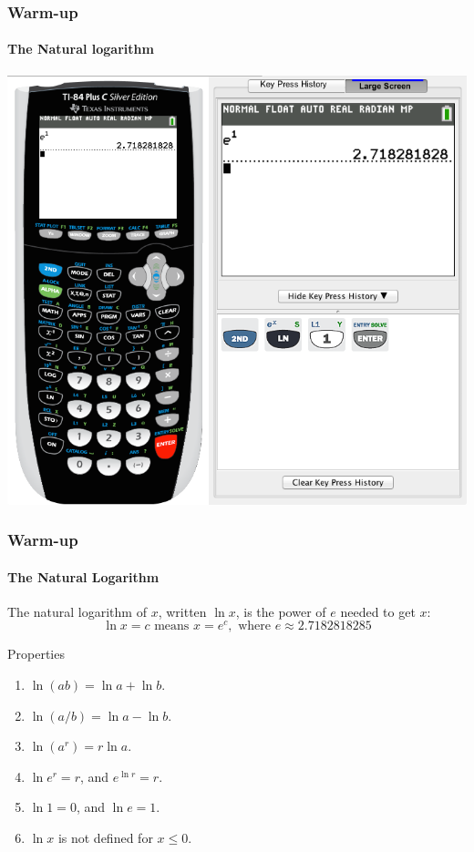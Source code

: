\documentclass[9pt,xcolor=x11names,compress]{beamer}
\begin{document}
\begin{frame}[c]\frametitle{Warm-up}
    
\framesubtitle{The Natural logarithm}

\begin{center}
\includegraphics[height=0.8\textheight]{ti84e.png}
\end{center}
\end{frame}

\begin{frame}[t]\frametitle{Warm-up}
\framesubtitle{The Natural Logarithm}
	\begin{definition}
	   The \alert{natural logarithm} of $x$, written $\ln x$, is the power of $e$ needed to get $x$:
	   \begin{equation*}
	   	\ln x = c \text{ means } x=e^c, \text{ where } e\approx 2.7182818285
	   \end{equation*}
	\end{definition}	
	\begin{block}{Properties}
	\begin{enumerate}[<+-|alert@+>]
		\item $\ln (ab) = \ln a + \ln b$.
		\item $\ln (a/b) = \ln a - \ln b$.
		\item $\ln (a^r) = r \ln a$.
		\item $\ln e^r = r$, and $e^{\ln r} = r$.
		\item $\ln 1 = 0$, and $\ln e = 1$.
		\item $\ln x$ is not defined for $x\leq0$.
	\end{enumerate}
	\end{block}
\end{frame}
\end{document}
